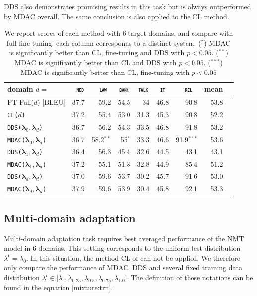\documentclass[11pt]{article}
\newcommand{\domain}[1]{\texttt{\textsc{#1}}}
\newcommand{\system}[1]{\texttt{{#1}}}
\newcommand{\vlambda}{\ensuremath{\boldsymbol\lambda}\xspace} %
\begin{document}
DDS also demonstrates promising results in this task but is always outperformed by MDAC overall. The same conclusion is also applied to the CL method.

\begin{table}[htbp]
  \centering \small
  \begin{tabular}{|l|*8{r|}} \hline
    domain \hfill $d=$ & \multicolumn{1}{c|}{\domain{ med}} & \multicolumn{1}{c|}{\domain{ law}} & \multicolumn{1}{c|}{\domain{bank}} & \multicolumn{1}{c|}{\domain{talk}} & \multicolumn{1}{c|}{\domain{ it }} & \multicolumn{1}{c|}{\domain{ rel}} & \multicolumn{1}{c|}{mean} \\ \hline
    FT-Full($d$) \hfill [BLEU] &37.7&59.2&54.5&34&46.8&90.8&53.8\\ \hline
    \hline
    \system{CL($d$)} &37.2&55.4&53.0&31.3&45.3&90.8&52.2\\ \hline
    \system{DDS($\vlambda_0, \vlambda_d$)} &36.7&56.2&54.3&33.5&46.8&91.8&53.2\\
    \system{MDAC($\vlambda_0, \vlambda_d$)} &36.7&58.2$^{**}$&55$^{*}$&33.3&46.6&91.9$^{***}$&53.6\\
     \hline
    \system{DDS($\vlambda_1, \vlambda_d$)} &36.4&56.3& 45.4& 32.6&44.5&43.1&43.1\\
    \system{MDAC($\vlambda_1, \vlambda_d$)} &37.2&55.1&51.8&32.8&44.9&85.4&51.2 \\ \hline
    \system{DDS($\vlambda_d, \vlambda_d$)} &37.0&59.6&53.7&30.2&45.7&91.6&53.0 \\
    \system{MDAC($\vlambda_d, \vlambda_d$)}&37.9&59.6&53.9&30.4&45.8&92.1&53.3 \\
    \hline
  \end{tabular}
  \caption{We report scores of each method with 6 target domains, and compare with full fine-tuning: each column corresponds to a distinct system. ($^{*}$) MDAC is significantly better than CL, fine-tuning and DDS with $p<0.05$. ($^{**}$) MDAC is significantly better than CL and DDS with $p<0.05$. ($^{***}$) MDAC is significantly better than CL, fine-tuning with $p<0.05$}
  \label{tab:da}
\end{table}

\subsection{Multi-domain adaptation}\label{ssec:mda}

Multi-domain adaptation task requires best averaged performance of the NMT model in 6 domains. This setting corresponds to the uniform test distribution $\lambda^t = \lambda_0$. In this situation, the method CL of \citet{Zhang19curriculum} can not be applied. We therefore only compare the performance of MDAC, DDS and several fixed training data distribution $\lambda^l \in \big[ \lambda_0, \lambda_{0.25}, \lambda_{0.5}, \lambda_{0.75}, \lambda_{1.0}\big]$. The definition of those notations can be found in the equation \ref{mixture:trn}.
\end{document}
